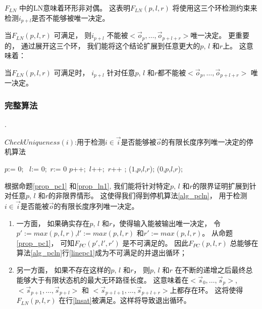 $F_{LN}$ 中的LN意味着环形非对偶。
这表明$F_{LN}(p,l,r)$ 将使用这三个环检测约束来检测$i_{p+l}$是否不能够被唯一决定。

当$F_{LN}(p,l,r)$ 可满足，
则$i_{p+l}$ 不能被$<\vec{o}_{p},\dots,\vec{o}_{p+l+r}>$唯一决定。
更重要的，
通过展开这三个环，
我们能将这个结论扩展到任意更大的$p$, $l$ 和$r$上。
这意味着：

\begin{proposition}\label{prop_ln1}
当$F_{LN}(p,l,r)$ 可满足时，
$i_{p+l}$ 针对任意$p$, $l$ 和$r$都不能被$<\vec{o}_{p},\dots,\vec{o}_{p+l+r}>$ 唯一决定。
\end{proposition}

\subsubsection{完整算法}\label{subsub_algo}.


\begin{algorithm}[t]
\caption{$CheckUniqueness(i)$:用于检测$i\in\vec{i}$是否能够被$\vec{o}$的有限长度序列唯一决定的停机算法}
\label{alg_pcln}
\begin{algorithmic}[1]
\STATE $p$:= 0; ~$l$:= 0;~$r$:= 0
\STATE $p$++;~$l$++;~$r$++ ;
\label{linepc1}
\RETURN ($1$,$p$,$l$,$r$)\label{lineln1};
\label{lnsat}
\RETURN ($0$,$p$,$l$,$r$);
\ENDIF
\ENDWHILE
\end{algorithmic}
\end{algorithm}

%




根据命题\ref{prop_pc1} 和\ref{prop_ln1},
我们能将针对特定$p$, $l$ 和$r$的限界证明扩展到针对任意$p$, $l$ 和$r$的非限界情形。
这使得我们得到停机算法\ref{alg_pcln}，
用于检测$i\in\vec{i}$是否能被$\vec{o}$的有限长度序列唯一决定。
\begin{enumerate}
 \item
一方面，
如果确实存在$p$, $l$ 和$r$，使得输入能被输出唯一决定，
令$p':=max(p,l,r)$,$l':=max(p,l,r)$ 和$r':=max(p,l,r)$。
从命题\ref{prop_pc1}，
可知$F_{PC}(p',l',r')$ 是不可满足的。
因此$F_{PC}(p,l,r)$ 总能够在算法\ref{alg_pcln}行\ref{linepc1}成为不可满足的并退出循环；
 \item
另一方面，
如果不存在这样的$p$, $l$ 和$r$，
则$p$, $l$ 和$r$ 在不断的递增之后最终总能够大于有限状态机的最大无环路径长度。
这意味着在$<\vec{s}_{0},\dots,\vec{s}_{p}>$,$<\vec{s}_{p+1},\dots,\vec{s}_{p+l}>$ 和
$<\vec{s}_{p+l+1},\dots,\vec{s}_{p+l+r}>$上都存在环。
这将使得$F_{LN}(p,l,r)$ 在行\ref{lnsat}被满足。这样将导致退出循环。
\end{enumerate}



